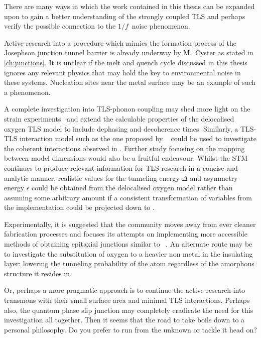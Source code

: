 \divtext

There are many ways in which the work contained in this thesis can be expanded upon to gain a better understanding of the strongly coupled TLS and perhaps verify the possible connection to the $1/f\,$ noise phenomenon.

Active research into a procedure which mimics the formation process of the Josephson junction tunnel barrier is already underway by M.~Cyster as stated in \cref{ch:junctions}.
It is unclear if the melt and quench cycle discussed in this thesis ignores any relevant physics that may hold the key to environmental noise in these systems.
Nucleation sites near the metal surface may be an example of such a phenomenon.

A complete investigation into TLS-phonon coupling may shed more light on the strain experiments~\cite{Grabovskij2012} and extend the calculable properties of the delocalised oxygen TLS model to include dephasing and decoherence times.
Similarly, a TLS-TLS interaction model such as the one proposed by \citeauthor{Faoro2014}~\cite{Faoro2014} could be used to investigate the coherent interactions observed in .
Further study focusing on the mapping between model dimensions would also be a fruitful endeavour. 
Whilst the STM continues to produce relevant information for TLS research in a concise and analytic manner, realistic values for the tunneling energy $\Delta$ and asymmetry energy $\epsilon$ could be obtained from the delocalised oxygen model rather than assuming some arbitrary amount if a consistent transformation of variables from the  implementation could be projected down to . 

Experimentally, it is suggested that the community moves away from ever cleaner fabrication processes and focuses its attempts on implementing more accessible methods of obtaining epitaxial junctions similar to \citeauthor{Oh2006}~\cite{Oh2006}.
An alternate route may be to investigate the substitution of oxygen to a heavier non metal in the insulating layer: lowering the tunneling probability of the atom regardless of the amorphous structure it resides in.

Or, perhaps a more pragmatic approach is to continue the active research into transmons with their small surface area and minimal TLS interactions.
Perhaps also, the quantum phase slip junction may completely eradicate the need for this investigation all together.
Then it seems that the road to take boils down to a personal philosophy.
Do you prefer to run from the unknown or tackle it head on?
\begin{center}
\resizebox{!}{1cm}{}
\end{center}
